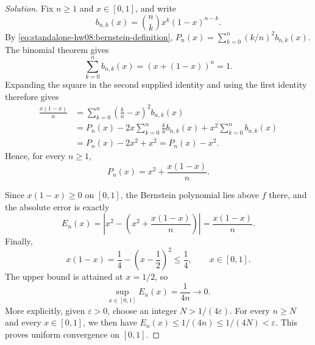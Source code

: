 \documentclass[11pt,letterpaper]{article}
\theoremstyle{definition}
\begin{document}
\begin{proof}[Solution]
  Fix $n\ge1$ and $x\in[0,1]$, and write
  \[
    b_{n,k}(x)=\binom{n}{k}x^k(1-x)^{n-k}.
  \]
  By \autoref{eq:standalone-hw08:bernstein-definition},
  $P_n(x)=\sum_{k=0}^{n}(k/n)^2b_{n,k}(x)$. The binomial theorem gives
  \[
    \sum_{k=0}^{n}b_{n,k}(x)=(x+(1-x))^n=1.
  \]
  Expanding the square in the second supplied identity and using the
  first identity therefore gives
  \[
    \begin{aligned}
      \frac{x(1-x)}n
        &=\sum_{k=0}^{n}\left(\frac{k}{n}-x\right)^2b_{n,k}(x)\\
        &=P_n(x)-2x\sum_{k=0}^{n}\frac{k}{n}b_{n,k}(x)
          +x^2\sum_{k=0}^{n}b_{n,k}(x)\\
        &=P_n(x)-2x^2+x^2=P_n(x)-x^2.
    \end{aligned}
  \]
  Hence, for every $n\ge1$,
  \[
    P_n(x)=x^2+\frac{x(1-x)}{n}.
  \]

  Since $x(1-x)\ge0$ on $[0,1]$, the Bernstein polynomial lies above
  $f$ there, and the absolute error is exactly
  \[
    E_n(x)=\left|x^2-\left(x^2+\frac{x(1-x)}{n}\right)\right|
      =\frac{x(1-x)}{n}.
  \]
  Finally,
  \[
    x(1-x)=\frac14-\left(x-\frac12\right)^2\le\frac14,
    \qquad x\in[0,1].
  \]
  The upper bound is attained at $x=1/2$, so
  \[
    \sup_{x\in[0,1]}E_n(x)=\frac1{4n}\longrightarrow0.
  \]
  More explicitly, given $\varepsilon>0$, choose an integer
  $N>1/(4\varepsilon)$. For every $n\ge N$ and every $x\in[0,1]$,
  we then have $E_n(x)\le1/(4n)\le1/(4N)<\varepsilon$.
  This proves uniform convergence on $[0,1]$.
\end{proof}
\end{document}
